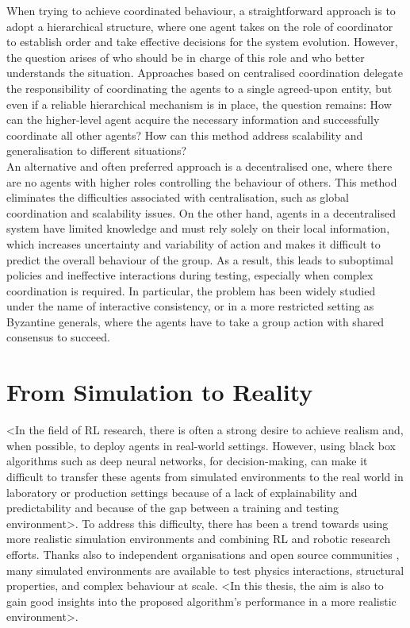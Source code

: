 \documentclass[a4paper,singleside,12pt]{report} %
\begin{document}
When trying to achieve coordinated behaviour, a straightforward approach is to adopt a hierarchical structure, where one agent takes on the role of coordinator to establish order and take effective decisions for the system evolution. However, the question arises of who should be in charge of this role and who better understands the situation. Approaches based on centralised coordination delegate the responsibility of coordinating the agents to a single agreed-upon entity, but even if a reliable hierarchical mechanism is in place, the question remains: How can the higher-level agent acquire the necessary information and successfully coordinate all other agents? How can this method address scalability and generalisation to different situations?\\
An alternative and often preferred approach is a decentralised one, where there are no agents with higher roles controlling the behaviour of others. This method eliminates the difficulties associated with centralisation, such as global coordination and scalability issues. On the other hand, agents in a decentralised system have limited knowledge and must rely solely on their local information, which increases uncertainty and variability of action and makes it difficult to predict the overall behaviour of the group. As a result, this leads to suboptimal policies and ineffective interactions during testing, especially when complex coordination is required. In particular, the problem has been widely studied under the name of interactive consistency, or in a more restricted setting as Byzantine generals, where the agents have to take a group action with shared consensus to succeed.

\section{From Simulation to Reality}\label{into-the-real-world}

<In the field of RL research, there is often a strong desire to achieve realism and, when possible, to deploy agents in real-world settings. However, using black box algorithms such as deep neural networks, for decision-making, can make it difficult to transfer these agents from simulated environments to the real world in laboratory or production settings because of a lack of explainability and predictability and because of the gap between a training and testing environment>. To address this difficulty, there has been a trend towards using more realistic simulation environments and combining RL and robotic research efforts. Thanks also to independent organisations \cite{UnityML} and open source communities \cite{Farama}, many simulated environments are available to test physics interactions, structural properties, and complex behaviour at scale. <In this thesis, the aim is also to gain good insights into the proposed algorithm's performance in a more realistic environment>.
\end{document}
